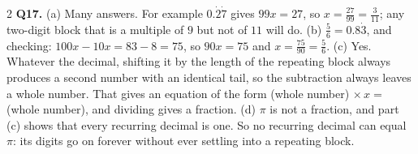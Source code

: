\documentclass[12pt,a4paper]{article}
\begin{document}
{\begin{multicols}{2}
\textbf{Q17.} (a) Many answers. For example $0.\dot{2}\dot{7}$ gives
$99x=27$, so $x=\tfrac{27}{99}=\tfrac{3}{11}$; any two-digit block that is a
multiple of $9$ but not of $11$ will do. \quad
(b) $\tfrac{5}{6}=0.8\dot{3}$, and checking: $100x-10x=83-8=75$, so $90x=75$
and $x=\tfrac{75}{90}=\tfrac{5}{6}$. \quad
(c) Yes. Whatever the decimal, shifting it by the length of the repeating
block always produces a second number with an identical tail, so the
subtraction always leaves a whole number. That gives an equation of the form
(whole number)$\,\times x=$ (whole number), and dividing gives a fraction.
\quad (d) $\pi$ is not a fraction, and part (c) shows that every recurring
decimal is one. So no recurring decimal can equal $\pi$: its digits go on
forever without ever settling into a repeating block.

\end{multicols}
}
\end{document}
